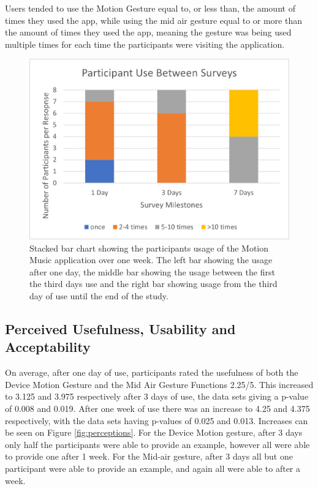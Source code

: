 \documentclass{l4proj}
\begin{document}
Users tended to use the Motion Gesture equal to, or less than, the amount of times they used the app, while using the mid air gesture equal to or more than the amount of times they used the app, meaning the gesture was being used multiple times for each time the participants were visiting the application. 

\begin{figure}[!htb]
    \centering
    \includegraphics[width=\textwidth]{images/Stacked Use.png}
        \caption{Stacked bar chart showing the participants usage of the Motion Music application over one week. The left bar showing the usage after one day, the middle bar showing the usage between the first the third days use and the right bar showing usage from the third day of use until the end of the study.}
        \label{fig:usage}
\end{figure}

\subsection{Perceived Usefulness, Usability and Acceptability}

On average, after one day of use, participants rated the usefulness of both the Device Motion Gesture and the Mid Air Gesture Functions 2.25/5. This increased to 3.125 and 3.975 respectively after 3 days of use, the data sets giving a p-value of 0.008 and 0.019. After one week of use there was an increase to 4.25 and 4.375 respectively, with the data sets having p-values of 0.025 and 0.013. Increases can be seen on Figure \ref{fig:perceptions}. For the Device Motion gesture, after 3 days only half the participants were able to provide an example, however all were able to provide one after 1 week. For the Mid-air gesture, after 3 days all but one participant were able to provide an example, and again all were able to after a week.
\end{document}
